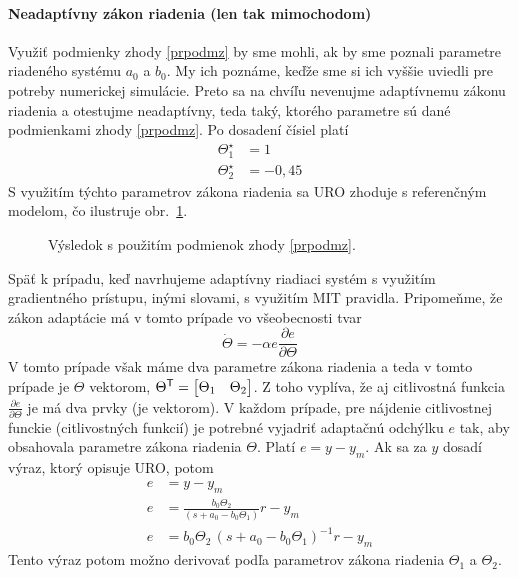 \documentclass[a4paper, 10pt, ]{article}
\begin{document}
\paragraph{Neadaptívny zákon riadenia (len tak mimochodom)}
Využiť podmienky zhody \eqref{prpodmz} by sme mohli, ak by sme poznali parametre riadeného systému $a_0$ a $b_0$. My ich poznáme, keďže sme si ich vyššie uviedli pre potreby numerickej simulácie. Preto sa na chvíľu nevenujme adaptívnemu zákonu riadenia a otestujme neadaptívny, teda taký, ktorého parametre sú dané podmienkami zhody \eqref{prpodmz}. Po dosadení čísiel platí
\begin{subequations}
    \begin{align}
        \Theta_1^\star &= 1  \\
        \Theta_2^\star &= -0,45
    \end{align}
\end{subequations}
S využitím týchto parametrov zákona riadenia sa URO zhoduje s referenčným modelom, čo ilustruje obr.~\ref{fig_tex_01_1}.






\begin{figure}[t]
	\centering


	\caption{Výsledok s použitím podmienok zhody \eqref{prpodmz}.}
	\label{fig_tex_01_1}

\end{figure}




\bigskip

\noindent
Späť k prípadu, keď navrhujeme adaptívny riadiaci systém s využitím gradientného prístupu, inými slovami, s využitím MIT pravidla. Pripomeňme, že zákon adaptácie má v tomto prípade vo všeobecnosti tvar
\begin{equation}
	\dot \Theta = - \alpha e \frac{\partial e}{\partial \Theta}
\end{equation}
V tomto prípade však máme dva parametre zákona riadenia a teda v tomto prípade je $\Theta$ vektorom, $\Theta^{\mathsf{T}} = \begin{bmatrix} \Theta_1 & \Theta_2 \end{bmatrix}$. Z toho vyplíva, že aj citlivostná funkcia $\frac{\partial e}{\partial \Theta}$ je má dva prvky (je vektorom). V každom prípade, pre nájdenie citlivostnej funckie (citlivostných funkcií) je potrebné vyjadriť adaptačnú odchýlku $e$ tak, aby obsahovala parametre zákona riadenia $\Theta$. Platí $e = y - y_m$. Ak sa za $y$ dosadí výraz, ktorý opisuje URO, potom
\begin{subequations}
    \begin{align}
        e &= y - y_m \\
        e &= \frac{b_0 \Theta_2}{\left( s + a_0 - b_0 \Theta_1 \right)} r - y_m \\
        e &= b_0 \Theta_2 \, \left( s + a_0 - b_0 \Theta_1 \right)^{-1} r - y_m
    \end{align}
\end{subequations}
Tento výraz potom možno derivovať podľa parametrov zákona riadenia $\Theta_1$ a $\Theta_2$.
\end{document}
